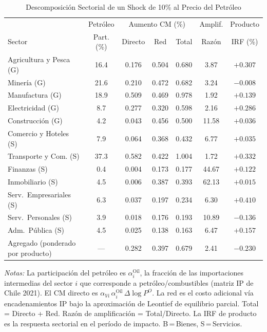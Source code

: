 \begin{table}[htbp]
\centering
\caption{Descomposición Sectorial de un Shock de 10\% al Precio del Petróleo}
\label{tab:oil_decomp}
\begin{threeparttable}
\small
\begin{tabular}{@{}l c c c c c c@{}}
\toprule
 & Petróleo & \multicolumn{3}{c}{Aumento CM (\%)} & Amplif. & Producto \\
\cmidrule(lr){3-5}
Sector & Part. (\%) & Directo & Red & Total & Razón & IRF (\%) \\
\midrule
Agricultura y Pesca (G) & 16.4 & 0.176 & 0.504 & 0.680 &  3.87 & $+0.307$ \\
Minería (G) & 21.6 & 0.210 & 0.472 & 0.682 &  3.24 & $-0.008$ \\
Manufactura (G) & 18.9 & 0.509 & 0.469 & 0.978 &  1.92 & $+0.139$ \\
Electricidad (G) &  8.7 & 0.277 & 0.320 & 0.598 &  2.16 & $+0.286$ \\
Construcción (G) &  4.2 & 0.043 & 0.456 & 0.500 & 11.58 & $+0.036$ \\
Comercio y Hoteles (S) &  7.9 & 0.064 & 0.368 & 0.432 &  6.77 & $+0.035$ \\
Transporte y Com. (S) & 37.3 & 0.582 & 0.422 & 1.004 &  1.72 & $+0.332$ \\
Finanzas (S) &  0.4 & 0.004 & 0.173 & 0.177 & 44.67 & $+0.122$ \\
Inmobiliario (S) &  4.5 & 0.006 & 0.387 & 0.393 & 62.13 & $+0.015$ \\
Serv.\ Empresariales (S) &  6.3 & 0.037 & 0.197 & 0.234 &  6.30 & $+0.410$ \\
Serv.\ Personales (S) &  3.9 & 0.018 & 0.176 & 0.193 & 10.89 & $-0.136$ \\
Adm.\ Pública (S) &  4.5 & 0.025 & 0.138 & 0.163 &  6.47 & $+0.157$ \\
\midrule
Agregado (ponderado por producto) & --- & 0.282 & 0.397 & 0.679 &  2.41 & $-0.230$ \\
\bottomrule
\end{tabular}
\begin{tablenotes}[flushleft]
\footnotesize
\item \textit{Notas:} La participación del petróleo es $\alpha^{\text{Oil}}_i$, la fracción de las importaciones intermedias del sector $i$ que corresponde a petróleo/combustibles (matriz IP de Chile 2021). El CM directo es $\alpha_{Vi}\,\alpha^{\text{Oil}}_i\,\Delta\log P^O$. La red es el costo adicional vía encadenamientos IP bajo la aproximación de Leontief de equilibrio parcial. Total = Directo + Red. Razón de amplificación = Total/Directo. La IRF de producto es la respuesta sectorial en el período de impacto. B\,=\,Bienes, S\,=\,Servicios.
\end{tablenotes}
\end{threeparttable}
\end{table}
